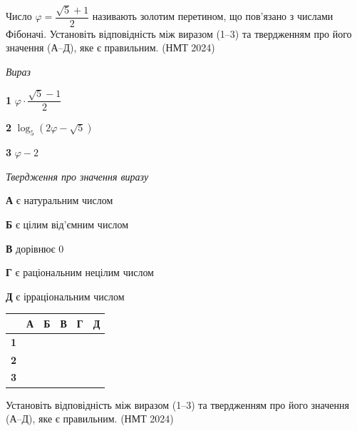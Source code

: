 \documentclass[14pt]{extarticle}
\newcommand{\matchTable}{
\begin{tabular}{|>{\centering\arraybackslash}p{0.25cm}|*{5}{>{\centering\arraybackslash}p{0.25cm}|}}
\hline
& \scriptsize\textbf{А} & \scriptsize\textbf{Б} & \scriptsize\textbf{В} & \scriptsize\textbf{Г} & \scriptsize\textbf{Д} \\
\hline
\scriptsize\textbf{1} & \rule{0pt}{0.25cm} & & & & \\
\hline
\scriptsize\textbf{2} & \rule{0pt}{0.25cm} & & & & \\
\hline
\scriptsize\textbf{3} & \rule{0pt}{0.25cm} & & & & \\
\hline
\end{tabular}
}
\newcommand{\task}[2]{\noindent\makebox[1.5em][l]{\textbf{#1.}}\parbox[t]{\dimexpr\textwidth-1.5em}{#2}}
\newcommand{\nmtyear}[1]{\hfill{\small\color{yearcolor}(НМТ #1)}}
\begin{document}
\task{14}{Число $\varphi = \dfrac{\sqrt{5} + 1}{2}$ називають золотим перетином, що пов'язано з числами Фібоначі. Установіть відповідність між виразом (1--3) та твердженням про його значення (А--Д), яке є правильним. \nmtyear{2024}}

\vspace{0.3cm}
\noindent
\begin{minipage}[t]{0.28\textwidth}
\vspace{0pt}
\textit{Вираз}

\vspace{0.2cm}
\textbf{1} \quad $\varphi \cdot \dfrac{\sqrt{5} - 1}{2}$

\vspace{0.3cm}
\textbf{2} \quad $\log_5(2\varphi - \sqrt{5})$

\vspace{0.2cm}
\textbf{3} \quad $\varphi - 2$
\end{minipage}
\hfill
\begin{minipage}[t]{0.45\textwidth}
\vspace{0pt}
\textit{Твердження про значення виразу}

\vspace{0.2cm}
\textbf{А} \quad є натуральним числом

\vspace{0.2cm}
\textbf{Б} \quad є цілим від'ємним числом

\vspace{0.2cm}
\textbf{В} \quad дорівнює 0

\vspace{0.2cm}
\textbf{Г} \quad є раціональним нецілим числом

\vspace{0.2cm}
\textbf{Д} \quad є ірраціональним числом
\end{minipage}
\hfill
\begin{minipage}[t]{0.18\textwidth}
\vspace{0pt}
\matchTable
\end{minipage}

\vspace{0.7cm}

\task{15}{Установіть відповідність між виразом (1--3) та твердженням про його значення (А--Д), яке є правильним. \nmtyear{2024}}
\end{document}
